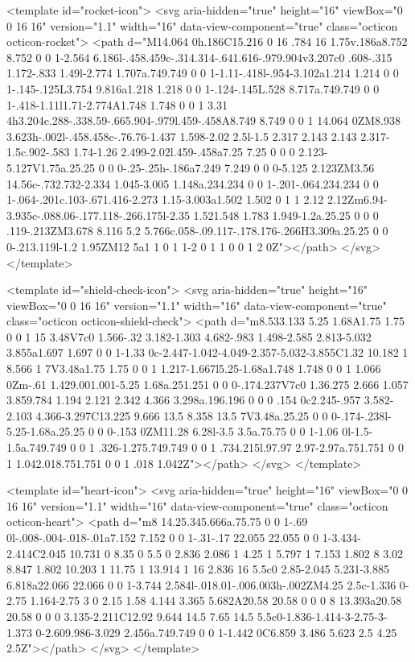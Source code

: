 {{<template id="rocket-icon">
  <svg aria-hidden="true" height="16" viewBox="0 0 16 16" version="1.1" width="16" data-view-component="true" class="octicon octicon-rocket">
    <path d="M14.064 0h.186C15.216 0 16 .784 16 1.75v.186a8.752 8.752 0 0 1-2.564 6.186l-.458.459c-.314.314-.641.616-.979.904v3.207c0 .608-.315 1.172-.833 1.49l-2.774 1.707a.749.749 0 0 1-1.11-.418l-.954-3.102a1.214 1.214 0 0 1-.145-.125L3.754 9.816a1.218 1.218 0 0 1-.124-.145L.528 8.717a.749.749 0 0 1-.418-1.11l1.71-2.774A1.748 1.748 0 0 1 3.31 4h3.204c.288-.338.59-.665.904-.979l.459-.458A8.749 8.749 0 0 1 14.064 0ZM8.938 3.623h-.002l-.458.458c-.76.76-1.437 1.598-2.02 2.5l-1.5 2.317 2.143 2.143 2.317-1.5c.902-.583 1.74-1.26 2.499-2.02l.459-.458a7.25 7.25 0 0 0 2.123-5.127V1.75a.25.25 0 0 0-.25-.25h-.186a7.249 7.249 0 0 0-5.125 2.123ZM3.56 14.56c-.732.732-2.334 1.045-3.005 1.148a.234.234 0 0 1-.201-.064.234.234 0 0 1-.064-.201c.103-.671.416-2.273 1.15-3.003a1.502 1.502 0 1 1 2.12 2.12Zm6.94-3.935c-.088.06-.177.118-.266.175l-2.35 1.521.548 1.783 1.949-1.2a.25.25 0 0 0 .119-.213ZM3.678 8.116 5.2 5.766c.058-.09.117-.178.176-.266H3.309a.25.25 0 0 0-.213.119l-1.2 1.95ZM12 5a1 1 0 1 1-2 0 1 1 0 0 1 2 0Z"></path>
</svg>
</template>

<template id="shield-check-icon">
  <svg aria-hidden="true" height="16" viewBox="0 0 16 16" version="1.1" width="16" data-view-component="true" class="octicon octicon-shield-check">
    <path d="m8.533.133 5.25 1.68A1.75 1.75 0 0 1 15 3.48V7c0 1.566-.32 3.182-1.303 4.682-.983 1.498-2.585 2.813-5.032 3.855a1.697 1.697 0 0 1-1.33 0c-2.447-1.042-4.049-2.357-5.032-3.855C1.32 10.182 1 8.566 1 7V3.48a1.75 1.75 0 0 1 1.217-1.667l5.25-1.68a1.748 1.748 0 0 1 1.066 0Zm-.61 1.429.001.001-5.25 1.68a.251.251 0 0 0-.174.237V7c0 1.36.275 2.666 1.057 3.859.784 1.194 2.121 2.342 4.366 3.298a.196.196 0 0 0 .154 0c2.245-.957 3.582-2.103 4.366-3.297C13.225 9.666 13.5 8.358 13.5 7V3.48a.25.25 0 0 0-.174-.238l-5.25-1.68a.25.25 0 0 0-.153 0ZM11.28 6.28l-3.5 3.5a.75.75 0 0 1-1.06 0l-1.5-1.5a.749.749 0 0 1 .326-1.275.749.749 0 0 1 .734.215l.97.97 2.97-2.97a.751.751 0 0 1 1.042.018.751.751 0 0 1 .018 1.042Z"></path>
</svg>
</template>

<template id="heart-icon">
  <svg aria-hidden="true" height="16" viewBox="0 0 16 16" version="1.1" width="16" data-view-component="true" class="octicon octicon-heart">
    <path d="m8 14.25.345.666a.75.75 0 0 1-.69 0l-.008-.004-.018-.01a7.152 7.152 0 0 1-.31-.17 22.055 22.055 0 0 1-3.434-2.414C2.045 10.731 0 8.35 0 5.5 0 2.836 2.086 1 4.25 1 5.797 1 7.153 1.802 8 3.02 8.847 1.802 10.203 1 11.75 1 13.914 1 16 2.836 16 5.5c0 2.85-2.045 5.231-3.885 6.818a22.066 22.066 0 0 1-3.744 2.584l-.018.01-.006.003h-.002ZM4.25 2.5c-1.336 0-2.75 1.164-2.75 3 0 2.15 1.58 4.144 3.365 5.682A20.58 20.58 0 0 0 8 13.393a20.58 20.58 0 0 0 3.135-2.211C12.92 9.644 14.5 7.65 14.5 5.5c0-1.836-1.414-3-2.75-3-1.373 0-2.609.986-3.029 2.456a.749.749 0 0 1-1.442 0C6.859 3.486 5.623 2.5 4.25 2.5Z"></path>
</svg>
</template>

}}
